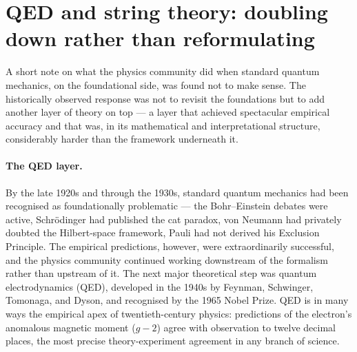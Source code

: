 \section{QED and string theory: doubling down rather than reformulating}\label{sec:qed-doubling}

A short note on what the physics community did when standard quantum mechanics, on the foundational side, was found not to make sense. The historically observed response was not to revisit the foundations but to add another layer of theory on top --- a layer that achieved spectacular empirical accuracy and that was, in its mathematical and interpretational structure, considerably harder than the framework underneath it.

\paragraph{The QED layer.}
By the late 1920s and through the 1930s, standard quantum mechanics had been recognised as foundationally problematic --- the Bohr--Einstein debates were active, Schr\"odinger had published the cat paradox, von Neumann had privately doubted the Hilbert-space framework, Pauli had not derived his Exclusion Principle. The empirical predictions, however, were extraordinarily successful, and the physics community continued working downstream of the formalism rather than upstream of it. The next major theoretical step was quantum electrodynamics (QED), developed in the 1940s by Feynman, Schwinger, Tomonaga, and Dyson, and recognised by the 1965 Nobel Prize. QED is in many ways the empirical apex of twentieth-century physics: predictions of the electron's anomalous magnetic moment ($g{-}2$) agree with observation to twelve decimal places, the most precise theory-experiment agreement in any branch of science.

